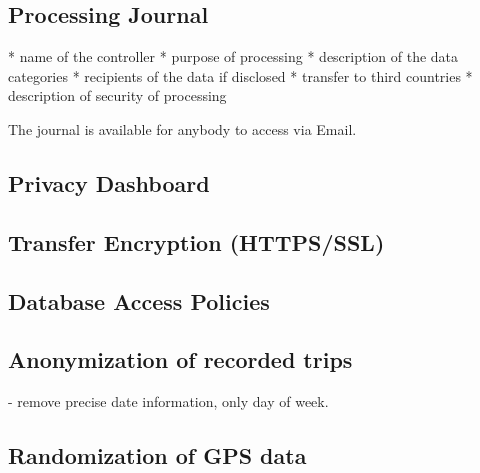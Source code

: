 \subsection{Processing Journal}
* name of the controller
* purpose of processing
* description of the data categories
* recipients of the data if disclosed
* transfer to third countries
* description of security of processing

The journal is available for anybody to access via Email.

\subsection{Privacy Dashboard}
\subsection{Transfer Encryption (HTTPS/SSL)}
\subsection{Database Access Policies}

\subsection{Anonymization of recorded trips}
- remove precise date information, only day of week.

\subsection{Randomization of GPS data}
